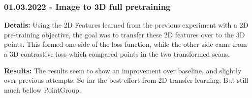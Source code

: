 \documentclass[12pt]{article}
\begin{document}
\subsubsection{01.03.2022 - Image to 3D full pretraining}

\textbf{Details:} Using the 2D Features learned from the previous experiment with a 2D pre-training objective, the goal was to transfer these 2D features over to the 3D points. This formed one side of the loss function, while the other side came from a 3D contrastive loss which compared points in the two transformed scans.

\textbf{Results:} The results seem to show an improvement over baseline, and slightly over previous attempts. So far the best effort from 2D transfer learning. But still much bellow PointGroup.

\newpage


\newpage


\end{document}
